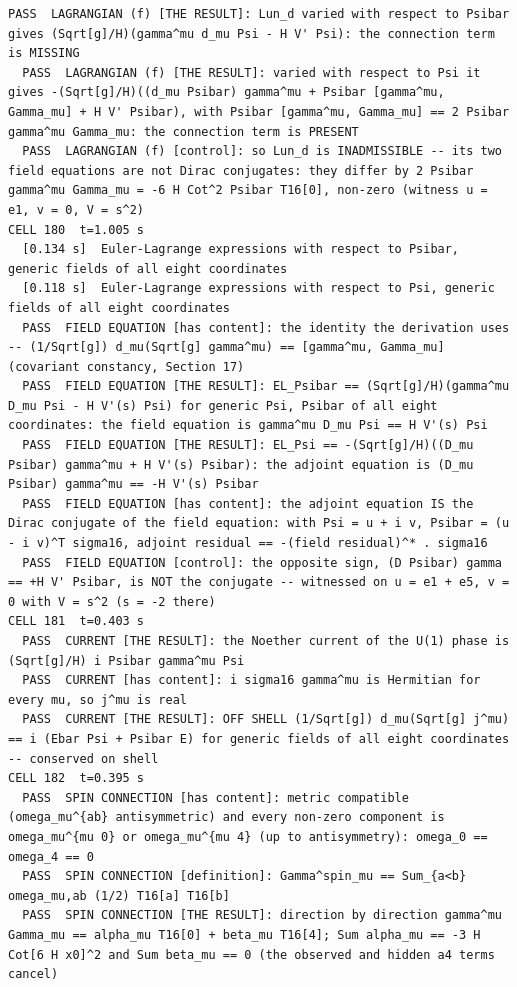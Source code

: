 \begin{Verbatim}[fontsize=\scriptsize]
  PASS  LAGRANGIAN (f) [THE RESULT]: Lun_d varied with respect to Psibar gives (Sqrt[g]/H)(gamma^mu d_mu Psi - H V' Psi): the connection term is MISSING
  PASS  LAGRANGIAN (f) [THE RESULT]: varied with respect to Psi it gives -(Sqrt[g]/H)((d_mu Psibar) gamma^mu + Psibar [gamma^mu, Gamma_mu] + H V' Psibar), with Psibar [gamma^mu, Gamma_mu] == 2 Psibar gamma^mu Gamma_mu: the connection term is PRESENT
  PASS  LAGRANGIAN (f) [control]: so Lun_d is INADMISSIBLE -- its two field equations are not Dirac conjugates: they differ by 2 Psibar gamma^mu Gamma_mu = -6 H Cot^2 Psibar T16[0], non-zero (witness u = e1, v = 0, V = s^2)
CELL 180  t=1.005 s
  [0.134 s]  Euler-Lagrange expressions with respect to Psibar, generic fields of all eight coordinates
  [0.118 s]  Euler-Lagrange expressions with respect to Psi, generic fields of all eight coordinates
  PASS  FIELD EQUATION [has content]: the identity the derivation uses -- (1/Sqrt[g]) d_mu(Sqrt[g] gamma^mu) == [gamma^mu, Gamma_mu] (covariant constancy, Section 17)
  PASS  FIELD EQUATION [THE RESULT]: EL_Psibar == (Sqrt[g]/H)(gamma^mu D_mu Psi - H V'(s) Psi) for generic Psi, Psibar of all eight coordinates: the field equation is gamma^mu D_mu Psi == H V'(s) Psi
  PASS  FIELD EQUATION [THE RESULT]: EL_Psi == -(Sqrt[g]/H)((D_mu Psibar) gamma^mu + H V'(s) Psibar): the adjoint equation is (D_mu Psibar) gamma^mu == -H V'(s) Psibar
  PASS  FIELD EQUATION [has content]: the adjoint equation IS the Dirac conjugate of the field equation: with Psi = u + i v, Psibar = (u - i v)^T sigma16, adjoint residual == -(field residual)^* . sigma16
  PASS  FIELD EQUATION [control]: the opposite sign, (D Psibar) gamma == +H V' Psibar, is NOT the conjugate -- witnessed on u = e1 + e5, v = 0 with V = s^2 (s = -2 there)
CELL 181  t=0.403 s
  PASS  CURRENT [THE RESULT]: the Noether current of the U(1) phase is (Sqrt[g]/H) i Psibar gamma^mu Psi
  PASS  CURRENT [has content]: i sigma16 gamma^mu is Hermitian for every mu, so j^mu is real
  PASS  CURRENT [THE RESULT]: OFF SHELL (1/Sqrt[g]) d_mu(Sqrt[g] j^mu) == i (Ebar Psi + Psibar E) for generic fields of all eight coordinates -- conserved on shell
CELL 182  t=0.395 s
  PASS  SPIN CONNECTION [has content]: metric compatible (omega_mu^{ab} antisymmetric) and every non-zero component is omega_mu^{mu 0} or omega_mu^{mu 4} (up to antisymmetry): omega_0 == omega_4 == 0
  PASS  SPIN CONNECTION [definition]: Gamma^spin_mu == Sum_{a<b} omega_mu,ab (1/2) T16[a] T16[b]
  PASS  SPIN CONNECTION [THE RESULT]: direction by direction gamma^mu Gamma_mu == alpha_mu T16[0] + beta_mu T16[4]; Sum alpha_mu == -3 H Cot[6 H x0]^2 and Sum beta_mu == 0 (the observed and hidden a4 terms cancel)

\end{Verbatim}

